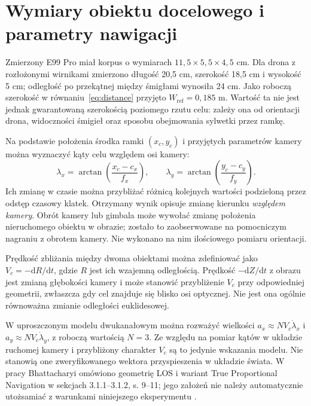 \documentclass[12pt,a4paper]{article}
\begin{document}
\section{Wymiary obiektu docelowego i parametry nawigacji}

Zmierzony E99 Pro miał korpus o wymiarach $11{,}5\times5{,}5\times4{,}5$ cm. Dla drona z rozłożonymi wirnikami zmierzono długość 20,5 cm, szerokość 18,5 cm i wysokość 5 cm; odległość po przekątnej między śmigłami wynosiła 24 cm. Jako roboczą szerokość w równaniu~\eqref{eq:distance} przyjęto $W_{\mathrm{ref}}=0{,}185$ m. Wartość ta nie jest jednak gwarantowaną szerokością poziomego rzutu celu: zależy ona od orientacji drona, widoczności śmigieł oraz sposobu obejmowania sylwetki przez ramkę.

Na podstawie położenia środka ramki $(x_c,y_c)$ i przyjętych parametrów kamery można wyznaczyć kąty celu względem osi kamery:
\begin{equation}
\lambda_x=\arctan\left(\frac{x_c-c_x}{f_x}\right),\qquad
\lambda_y=\arctan\left(\frac{y_c-c_y}{f_y}\right).
\label{eq:los}
\end{equation}
Ich zmianę w czasie można przybliżać różnicą kolejnych wartości podzieloną przez odstęp czasowy klatek. Otrzymany wynik opisuje zmianę kierunku \emph{względem kamery}. Obrót kamery lub gimbala może wywołać zmianę położenia nieruchomego obiektu w obrazie; zostało to zaobserwowane na pomocniczym nagraniu z obrotem kamery. Nie wykonano na nim ilościowego pomiaru orientacji.

Prędkość zbliżania między dwoma obiektami można zdefiniować jako $V_c=-\mathrm{d}R/\mathrm{d}t$, gdzie $R$ jest ich wzajemną odległością. Prędkość $-\mathrm{d}Z/\mathrm{d}t$ z obrazu jest zmianą głębokości kamery i może stanowić przybliżenie $V_c$ przy odpowiedniej geometrii, zwłaszcza gdy cel znajduje się blisko osi optycznej. Nie jest ona ogólnie równoważna zmianie odległości euklidesowej.

W uproszczonym modelu dwukanałowym można rozważyć wielkości $a_x\approx N V_c\dot\lambda_x$ i $a_y\approx N V_c\dot\lambda_y$, z roboczą wartością $N=3$. Ze względu na pomiar kątów w układzie ruchomej kamery i przybliżony charakter $V_c$ są to jedynie wskazania modelu. Nie stanowią one zweryfikowanego wektora przyspieszenia w układzie świata. W pracy Bhattacharyi omówiono geometrię LOS i wariant True Proportional Navigation w sekcjach 3.1.1--3.1.2, s. 9--11; jego założeń nie należy automatycznie utożsamiać z warunkami niniejszego eksperymentu \cite{bhattacharya}.
\end{document}
